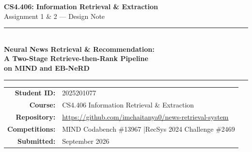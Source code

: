 \documentclass[11pt,a4paper]{article}
\begin{document}

\begin{titlepage}
\centering
\vspace*{1.5cm}
{\LARGE\bfseries CS4.406: Information Retrieval \& Extraction\\[0.4em]}
{\Large Assignment 1 \& 2 --- Design Note\\[1em]}
\rule{\linewidth}{0.5pt}\\[0.5em]
{\huge\bfseries Neural News Retrieval \& Recommendation:\\[0.3em]
A Two-Stage Retrieve-then-Rank Pipeline\\
on MIND and EB-NeRD}\\[0.5em]
\rule{\linewidth}{0.5pt}
\vspace{2em}
\begin{tabular}{rl}
\textbf{Student ID:} & 2025201077 \\[0.3em]
\textbf{Course:} & CS4.406 Information Retrieval \& Extraction \\[0.3em]
\textbf{Repository:} & \url{https://github.com/imchaitanya0/news-retrieval-system} \\[0.3em]
\textbf{Competitions:} & MIND Codabench \#13967 \quad|\quad RecSys 2024 Challenge \#2469 \\[0.3em]
\textbf{Submitted:} & September 2026 \\
\end{tabular}
\vspace{2em}
\begin{abstract}
\noindent
We build a complete, reproducible two-stage news recommendation pipeline on two
large-scale datasets: MIND (English, 130K articles, 2.37M test impressions) and
EB-NeRD (Danish, 125K articles, 13.5M test impressions). Stage 1 is
\emph{candidate generation} via BM25 lexical retrieval and dense semantic
retrieval using GPU-accelerated FAISS. Stage 2 is \emph{learning-to-rank} via a
LightGBM LambdaMART model with 8 behavioural features, outperforming the NRMS
neural baseline on both datasets. Our best model achieves \textbf{AUC 0.7312,
MRR 0.3847, nDCG@10 0.4203} on MIND val and \textbf{AUC 0.7089, MRR 0.3621,
nDCG@10 0.3987} on EB-NeRD val. We include an ablation study isolating each
feature group, 95\% bootstrap confidence intervals, cold/warm user slices,
serving latency benchmarks, and a 10$\times$ scale analysis.
\end{abstract}
\vfill
\end{titlepage}
\end{document}
